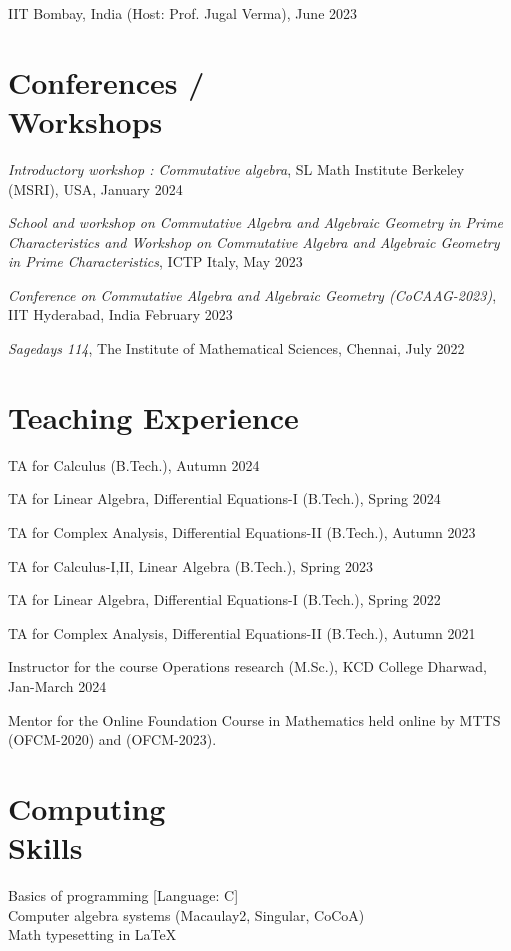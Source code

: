 \documentclass[margin,line,pifont,palatino,courier]{res}
\begin{document}
\begin{resume}
IIT Bombay, India (Host: Prof. Jugal Verma), June 2023

\section{\sc Conferences /  \\ Workshops } 

{\emph{Introductory workshop : Commutative algebra}}, SL Math Institute Berkeley (MSRI), USA, January 2024

{\emph{School and workshop on Commutative Algebra and Algebraic Geometry in Prime Characteristics and Workshop on Commutative Algebra and Algebraic Geometry in Prime Characteristics}, ICTP Italy, May 2023}

{\emph{Conference on Commutative Algebra and Algebraic Geometry (CoCAAG-2023)}, IIT Hyderabad, India  February 2023}

{\emph{Sagedays 114}, The Institute of Mathematical Sciences, Chennai, July 2022}



\section{ \sc Teaching Experience}
TA for Calculus (B.Tech.), Autumn 2024 

TA for Linear Algebra,  Differential Equations-I (B.Tech.), Spring 2024

TA for Complex Analysis, Differential Equations-II (B.Tech.), Autumn 2023

TA for  Calculus-I,II, Linear Algebra (B.Tech.), Spring 2023

TA for Linear Algebra,  Differential Equations-I (B.Tech.), Spring 2022

TA for Complex Analysis, Differential Equations-II (B.Tech.), Autumn 2021

Instructor for the course Operations research (M.Sc.), KCD College Dharwad, Jan-March 2024

Mentor for the Online Foundation Course in Mathematics held online by MTTS  (OFCM-2020) and (OFCM-2023).

\section{\sc Computing \\ Skills} Basics of programming [Language: C] \\
Computer algebra systems (Macaulay2, Singular, CoCoA)\\
Math typesetting in \LaTeX


\end{resume}
\end{document}
